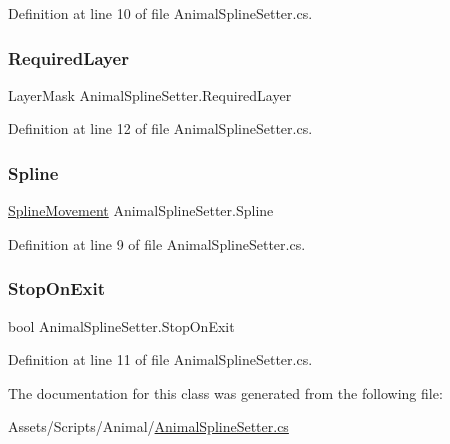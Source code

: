 Definition at line 10 of file Animal\+Spline\+Setter.\+cs.

\mbox{\label{class_animal_spline_setter_ae2e2fd2013d81beb87eefebef257c933}} 
\subsubsection{\texorpdfstring{Required\+Layer}{RequiredLayer}}
{\footnotesize\ttfamily Layer\+Mask Animal\+Spline\+Setter.\+Required\+Layer}



Definition at line 12 of file Animal\+Spline\+Setter.\+cs.

\mbox{\label{class_animal_spline_setter_ac4513c94ec6fbc609f2b74945f36318d}} 
\subsubsection{\texorpdfstring{Spline}{Spline}}
{\footnotesize\ttfamily \mbox{\hyperlink{class_spline_movement}{Spline\+Movement}} Animal\+Spline\+Setter.\+Spline}



Definition at line 9 of file Animal\+Spline\+Setter.\+cs.

\mbox{\label{class_animal_spline_setter_a989e1768f8f6d6d3fe8a2a11f72e145c}} 
\subsubsection{\texorpdfstring{Stop\+On\+Exit}{StopOnExit}}
{\footnotesize\ttfamily bool Animal\+Spline\+Setter.\+Stop\+On\+Exit}



Definition at line 11 of file Animal\+Spline\+Setter.\+cs.



The documentation for this class was generated from the following file\+:\begin{DoxyCompactItemize}
\item 
Assets/\+Scripts/\+Animal/\mbox{\hyperlink{_animal_spline_setter_8cs}{Animal\+Spline\+Setter.\+cs}}\end{DoxyCompactItemize}
